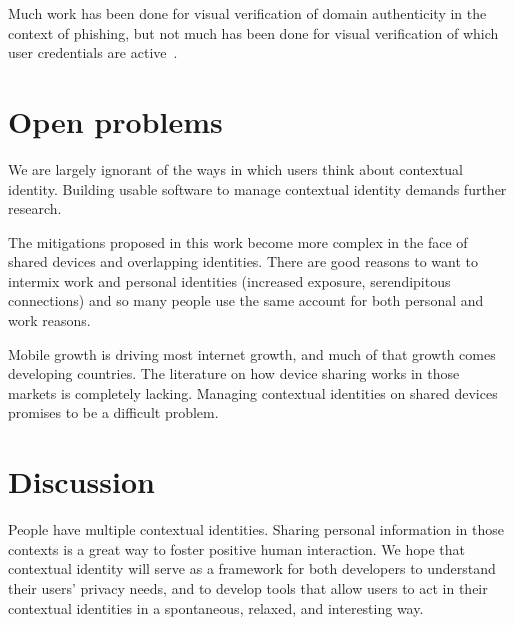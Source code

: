 \documentclass{llncs}
\begin{document}
Much work has been done for visual verification of domain authenticity in the
context of phishing, but not much has been done for visual verification of
which user credentials are active~\cite{skins}.

\section{Open problems}
We are largely ignorant of the ways in which users think about contextual
identity. Building usable software to manage contextual identity demands
further research.

The mitigations proposed in this work become more complex in the face of shared
devices and overlapping identities. There are good reasons to want to intermix
work and personal identities (increased exposure, serendipitous connections)
and so many people use the same account for both personal and work reasons.

Mobile growth is driving most internet growth, and much of that growth comes
developing countries. The literature on how device sharing works in those
markets is completely lacking. Managing contextual identities on shared devices
promises to be a difficult problem.

\section{Discussion}
People have multiple contextual identities. Sharing personal information in
those contexts is a great way to foster positive human interaction.  We hope
that contextual identity will serve as a framework for both developers to
understand their users' privacy needs, and to develop tools that allow users to
act in their contextual identities in a spontaneous, relaxed, and interesting
way.

\begin{comment}
papers:
expectation of privacy\cite{viegas}
http://jcmc.indiana.edu/vol10/issue3/viegas.html

danah boyd
making sense of privacy and publicity: whose voice counts? does your child's
teacher have a right to be public in her other roles online? does she have a
right to be secular? religious? friend? lover? if you work for company X and
you disagree with their policies, are you allowed to be public about
that:?\cite{boyd2}

close to you “stranger on a train” “stranger on a plane”
first party regrets, third party regrets
impossible to judge how big friends of friends

\end{comment}

\begin{comment}
\section{Acknowledgements}
The authors thank
Lucas Adamski
Ben Adida
Mike Connor
Ed Lee
\end{comment}



\end{document}
